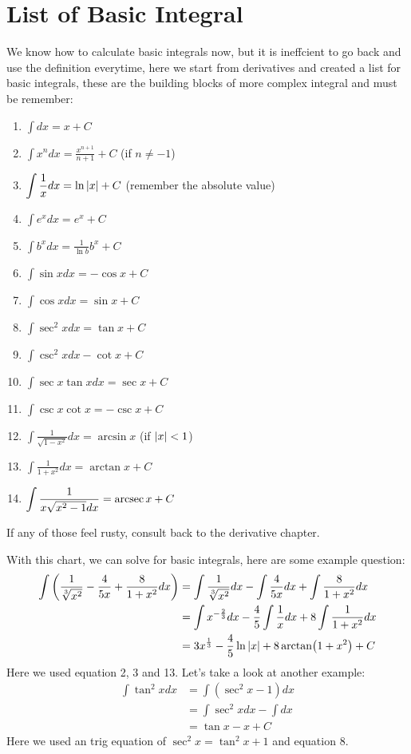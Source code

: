 \documentclass{article}
\begin{document}
\newpage
\section{List of Basic Integral}
We know how to calculate basic integrals now, but it is ineffcient to go back and use the definition everytime,
here we start from derivatives and created a list for basic integrals, these are the building blocks of more complex integral
and must be remember:
\begin{enumerate}
    \item $\displaystyle \int dx = x + C$
    \item $\displaystyle \int x^n dx = \frac{x^{n+1}}{n+1} +C$ (if $n\neq -1$)
    \item $\displaystyle \int \frac{1}{x}dx = \ln{\abs{x}}+C$ (remember the absolute value)
    \item $\displaystyle \int e^x dx = e^x +C$
    \item $\displaystyle \int b^x dx = \frac{1}{\ln b} b^x+C$
    \item $\displaystyle \int \sin x dx= -\cos x +C$
    \item $\displaystyle \int \cos x dx = \sin x +C$
    \item $\displaystyle \int \sec^2 x dx = \tan x +C$
    \item $\displaystyle \int \csc^2 x dx -\cot x+C$
    \item $\displaystyle \int \sec x \tan x dx = \sec x+C$
    \item $\displaystyle \int \csc x \cot x = -\csc x+C$
    \item $\displaystyle \int \frac{1}{\sqrt{1-x^2}}dx = \arcsin x$ (if $\abs{x}<1$)
    \item $\displaystyle \int \frac{1}{1+x^2}dx = \arctan x+C$
    \item $\displaystyle \int \frac{1}{x\sqrt{x^2-1}dx} = \arcsec x +C$
\end{enumerate}
If any of those feel rusty, consult back to the derivative chapter. 

With this chart, we can solve for basic integrals, here are some example question:
\begin{align*}
    \int \left(\frac{1}{\sqrt[3]{x^2}}-\frac{4}{5x}+\frac{8}{1+x^2}dx\right) &= \int \frac{1}{\sqrt[3]{x^2}}dx - \int \frac{4}{5x}dx + \int\frac{8}{1+x^2}dx\\
    &=\int x^{-\frac{2}{3}} dx- \frac{4}{5} \int \frac{1}{x}dx + 8 \int \frac{1}{1+x^2}dx\\
    &= 3x^{\frac{1}{3}} - \frac{4}{5}\ln{\abs{x}} + 8\arctan(1+x^2)+C
\end{align*}
Here we used equation 2, 3 and 13.
\newpage
Let's take a look at another example:
\begin{align*}
    \int \tan^2 x dx &= \int (\sec^2 x -1)dx\\
    &= \int \sec^2 x dx - \int dx\\
    &= \tan x - x +C
\end{align*}
Here we used an trig equation of $\sec^2 x = \tan^2 x +1$ and equation 8.
\end{document}
